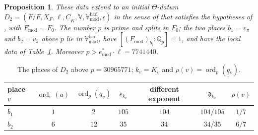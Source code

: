 \documentclass[11pt]{amsart}
\newtheorem{proposition}[theorem]{Proposition}
\theoremstyle{remark}
\newcommand{\Qp}{\mathbb Q_p}
\newcommand{\dd}{\mathfrak d}
\newcommand{\qq}{\underline{\underline{q}}{}}
\newcommand{\Fmod}{F_{\mathrm{mod}}}
\newcommand{\VV}{\underline{\mathbb V}}
\newcommand{\Vbadmod}{\mathbb V^{\mathrm{bad}}_{\mathrm{mod}}}
\begin{document}
\begin{proposition}\label{p:datum}
These data extend to an initial $\Theta$-datum
$D_2=(\overline F/F,X_F,\ell,\underline C_K,\VV,\Vbadmod,\underline\epsilon)$ in the sense of
\cite[Def.~3.1]{IUT1} that satisfies the hypotheses of \cite[Thm.~1.10]{IUT4}, with $\Fmod=F_0$. The number $p$ is
prime and splits in $F_0$; the two places $b_1=v_\pi$ and $b_2=v_{\bar\pi}$ above $p$ lie in $\Vbadmod$, have
$[(\Fmod)_{b_i}:\Qp]=1$, and have the local data of Table~\ref{tab:D2}. Moreover
$p>e^*_{\mathrm{mod}}\cdot\ell=7741440$.
\end{proposition}

\begin{table}[ht]
\centering
\begin{tabular}{@{}lcccccc@{}}
\toprule
place $v$ & $\operatorname{ord}_v(a)$ & $\operatorname{ord}_p(q_v)$ & $e_{k_v}$ & different exponent & $\dd_{k_v}$
  & $\rho(v)$\\
\midrule
$b_1$ & $1$ & $2$ & $105$ & $104$ & $104/105$ & $1/7$\\
$b_2$ & $6$ & $12$ & $35$ & $34$ & $34/35$ & $6/7$\\
\bottomrule
\end{tabular}
\caption{The places of $D_2$ above $p=30965771$; $k_v=K_{\underline v}$ and $\rho(v)=\operatorname{ord}_p(\qq_v)$.}\label{tab:D2}
\end{table}
\end{document}
